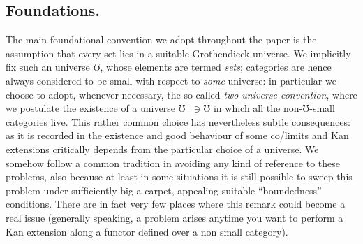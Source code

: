 
\subsection*{Foundations.} The main foundational convention we adopt throughout the paper is the assumption \cite{artin1972sga} that every set lies in a suitable Grothendieck universe. We implicitly fix such an universe $\mho$, whose elements are termed \emph{sets}; categories are hence always considered to be small with respect to \emph{some} universe: in particular we choose to adopt, whenever necessary, the so\hyp{}called \emph{two\hyp{}universe convention}, where we postulate the existence of a universe $\mho^+\ni \mho$ in which all the non-$\mho$\hyp{}small categories live. This rather common choice has nevertheless subtle consequences: as it is recorded in \cite{low2013universes} the existence and good behaviour of some co/limits and Kan extensions critically depends from the particular choice of a universe. We somehow follow a common tradition in avoiding any kind of reference to these problems, also because at least in some situations it is still possible to sweep this problem under sufficiently big a carpet, appealing suitable ``boundedness'' conditions. There are in fact very few places where this remark could become a real issue (generally speaking, a problem arises anytime you want to perform a Kan extension along a functor defined over a non small category).
